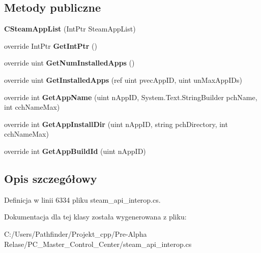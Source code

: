 \subsection*{Metody publiczne}
\begin{DoxyCompactItemize}
\item 
\mbox{\label{class_valve_1_1_steamworks_1_1_c_steam_app_list_a4907bc83c546642c5c1a5e110fbed564}} 
{\bfseries C\+Steam\+App\+List} (Int\+Ptr Steam\+App\+List)
\item 
\mbox{\label{class_valve_1_1_steamworks_1_1_c_steam_app_list_ae3923f2b48064648ac6af614f39e861b}} 
override Int\+Ptr {\bfseries Get\+Int\+Ptr} ()
\item 
\mbox{\label{class_valve_1_1_steamworks_1_1_c_steam_app_list_a060d17d4c7a2aec9ccdf4969256d199a}} 
override uint {\bfseries Get\+Num\+Installed\+Apps} ()
\item 
\mbox{\label{class_valve_1_1_steamworks_1_1_c_steam_app_list_a98c36f0c509f3920fd0a6670738a75a8}} 
override uint {\bfseries Get\+Installed\+Apps} (ref uint pvec\+App\+ID, uint un\+Max\+App\+I\+Ds)
\item 
\mbox{\label{class_valve_1_1_steamworks_1_1_c_steam_app_list_a4e84a3d2345f4cc066b898f790454841}} 
override int {\bfseries Get\+App\+Name} (uint n\+App\+ID, System.\+Text.\+String\+Builder pch\+Name, int cch\+Name\+Max)
\item 
\mbox{\label{class_valve_1_1_steamworks_1_1_c_steam_app_list_a4a18e28a1acb2bb2babb2251ab76f52a}} 
override int {\bfseries Get\+App\+Install\+Dir} (uint n\+App\+ID, string pch\+Directory, int cch\+Name\+Max)
\item 
\mbox{\label{class_valve_1_1_steamworks_1_1_c_steam_app_list_a29b1d8fefc63dbb06f3c0fe70bc548f1}} 
override int {\bfseries Get\+App\+Build\+Id} (uint n\+App\+ID)
\end{DoxyCompactItemize}


\subsection{Opis szczegółowy}


Definicja w linii 6334 pliku steam\+\_\+api\+\_\+interop.\+cs.



Dokumentacja dla tej klasy została wygenerowana z pliku\+:\begin{DoxyCompactItemize}
\item 
C\+:/\+Users/\+Pathfinder/\+Projekt\+\_\+cpp/\+Pre-\/\+Alpha Relase/\+P\+C\+\_\+\+Master\+\_\+\+Control\+\_\+\+Center/steam\+\_\+api\+\_\+interop.\+cs\end{DoxyCompactItemize}
